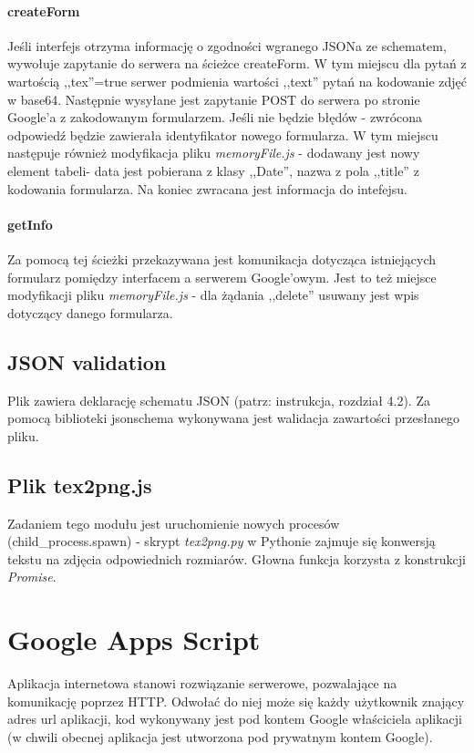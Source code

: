 \paragraph{createForm} Jeśli interfejs otrzyma informację o zgodności wgranego JSONa ze schematem, wywołuje zapytanie do serwera na ścieżce createForm. W tym miejscu dla pytań z wartością ,,tex''=true serwer podmienia wartości ,,text'' pytań na kodowanie zdjęć w base64. Następnie wysyłane jest zapytanie POST do serwera po stronie Google'a z zakodowanym formularzem. Jeśli nie będzie błędów - zwrócona odpowiedź będzie zawierała identyfikator nowego formularza. W tym miejscu następuje również modyfikacja pliku \textit{memoryFile.js} - dodawany jest nowy element tabeli- data jest pobierana z klasy ,,Date'', nazwa z pola ,,title'' z kodowania formularza. Na koniec zwracana jest informacja do intefejsu.
\paragraph{getInfo} Za pomocą tej ścieżki  przekazywana jest komunikacja dotycząca istniejących formularz pomiędzy interfacem a serwerem Google'owym. Jest to też miejsce modyfikacji pliku \textit{memoryFile.js} - dla żądania ,,delete'' usuwany jest wpis dotyczący danego formularza.
\subsection{JSON validation} Plik zawiera deklarację schematu JSON (patrz: instrukcja, rozdział 4.2). Za pomocą biblioteki jsonschema wykonywana jest walidacja zawartości przesłanego pliku.
\subsection{Plik tex2png.js} Zadaniem tego modułu jest uruchomienie nowych procesów (child\_process.spawn)  - skrypt \textit{tex2png.py} w Pythonie zajmuje się konwersją tekstu na zdjęcia odpowiednich rozmiarów. Głowna funkcja korzysta z konstrukcji \textit{Promise}.

\section{Google Apps Script}
Aplikacja internetowa stanowi rozwiązanie serwerowe, pozwalające na komunikację poprzez HTTP. Odwołać do niej może się każdy użytkownik znający adres url aplikacji, kod wykonywany jest pod kontem Google właściciela aplikacji (w chwili obecnej aplikacja jest utworzona pod prywatnym kontem Google).


